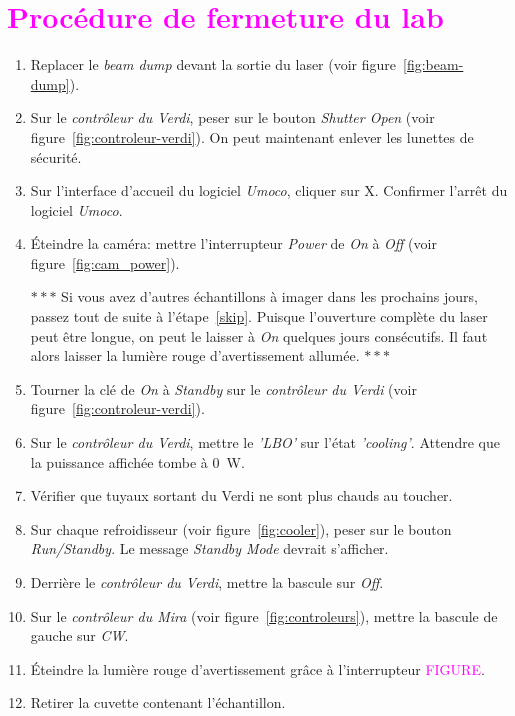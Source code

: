 \section{\textcolor{magenta}{Procédure de fermeture du lab}}


\begin{enumerate}
    \item Replacer le \textit{beam dump} devant la sortie du laser (voir figure~\ref{fig:beam-dump}).
    \item Sur le \textit{contrôleur du Verdi}, peser sur le bouton \textit{Shutter Open} (voir figure~\ref{fig:controleur-verdi}). On peut maintenant enlever les lunettes de sécurité.
    \item Sur l'interface d'accueil du logiciel \textit{Umoco}, cliquer sur X. Confirmer l'arrêt du logiciel \textit{Umoco}.
    \item Éteindre la caméra: mettre l'interrupteur \textit{Power} de \textit{On} à \textit{Off} (voir figure~\ref{fig:cam_power}).
\begin{center} $\ast\ast\ast$ Si vous avez d'autres échantillons à imager dans les prochains jours, passez tout de suite à l'étape~\ref{skip}. Puisque l'ouverture complète du laser peut être longue, on peut le laisser à \textit{On} quelques jours consécutifs. Il faut alors laisser la lumière rouge d'avertissement allumée.  $\ast\ast\ast$ \end{center}
    \item Tourner la clé de \textit{On} à \textit{Standby} sur le \textit{contrôleur du Verdi} (voir figure~\ref{fig:controleur-verdi}).
    \item Sur le \textit{contrôleur du Verdi}, mettre le \textit{'LBO'} sur l'état \textit{'cooling'}. Attendre que la puissance affichée tombe à 0~W.
    \item Vérifier que tuyaux sortant du Verdi ne sont plus chauds au toucher.
    \item Sur chaque refroidisseur (voir figure~\ref{fig:cooler}), peser sur le bouton \textit{Run/Standby}. Le message \textit{Standby Mode} devrait s'afficher.
    \item Derrière le \textit{contrôleur du Verdi}, mettre la bascule sur \textit{Off}.
    \item Sur le \textit{contrôleur du Mira} (voir figure~\ref{fig:controleurs}), mettre la bascule de gauche sur \textit{CW}.
    \item Éteindre la lumière rouge d'avertissement grâce à l'interrupteur \textcolor{magenta}{FIGURE}.
    \item \label{skip} Retirer la cuvette contenant l'échantillon.

\end{enumerate}
